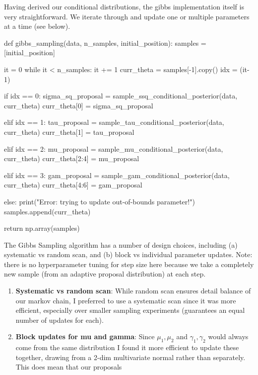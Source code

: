 \documentclass[12pt,letterpaper,twoside]{article}
\begin{document}
Having derived our conditional distributions, the gibbs implementation
itself is very straightforward. We iterate through and update one or 
multiple parameters at a time (see below).  
\begin{python}
def gibbs_sampling(data, n_samples, initial_position):
    samples = [initial_position]

    it = 0
    while it < n_samples:
        it += 1
        curr_theta = samples[-1].copy()
        idx = (it-1) %

        if idx == 0:
            sigma_sq_proposal = sample_ssq_conditional_posterior(data, curr_theta)
            curr_theta[0] = sigma_sq_proposal

        elif idx == 1:
            tau_proposal = sample_tau_conditional_posterior(data, curr_theta)
            curr_theta[1] = tau_proposal

        elif idx == 2:
            mu_proposal = sample_mu_conditional_posterior(data, curr_theta)
            curr_theta[2:4] = mu_proposal

        elif idx == 3:
            gam_proposal = sample_gam_conditional_posterior(data, curr_theta)
            curr_theta[4:6] = gam_proposal

        else:
            print("Error: trying to update out-of-bounds parameter!")
        samples.append(curr_theta)

    return np.array(samples)
\end{python}

The Gibbs Sampling algorithm has a number of design 
choices, including (a) systematic vs random scan, and
(b) block vs individual parameter updates. Note: there 
is no hyperparameter tuning for step size here because 
we take a completely new sample (from an adaptive proposal 
distribution) at each step.

\begin{enumerate}[label=(\alph*)]
\item \textbf{Systematic vs random scan}: While random scan ensures 
detail balance of our markov chain, I preferred to use a 
systematic scan since it was more efficient, especially over 
smaller sampling experiments (guarantees an equal number of 
updates for each).

\item \textbf{Block updates for mu and gamma}: Since $\mu_1, \mu_2$ 
and $\gamma_1, \gamma_2$ would always come from the same 
distribution I found it more efficient to update these together, 
drawing from a 2-dim multivariate normal rather than separately. 
This does mean that our proposals
\end{enumerate}
\end{document}
